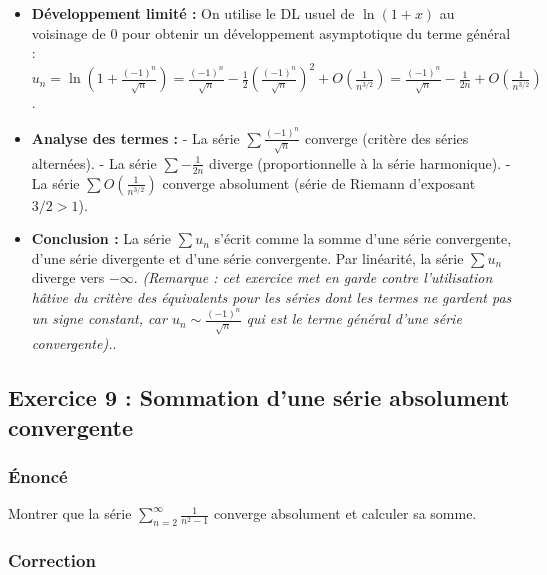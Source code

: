 \documentclass[12pt,a4paper]{report}
\begin{document}
\begin{itemize}
\item \textbf{Développement limité :}
   On utilise le DL usuel de $\ln(1+x)$ au voisinage de 0 pour obtenir un développement asymptotique du terme général :
   $u_n = \ln(1 + \frac{(-1)^n}{\sqrt{n}}) = \frac{(-1)^n}{\sqrt{n}} - \frac{1}{2}(\frac{(-1)^n}{\sqrt{n}})^2 + O(\frac{1}{n^{3/2}}) = \frac{(-1)^n}{\sqrt{n}} - \frac{1}{2n} + O(\frac{1}{n^{3/2}})$.
\item \textbf{Analyse des termes :}
   - La série $\sum \frac{(-1)^n}{\sqrt{n}}$ converge (critère des séries alternées).
   - La série $\sum -\frac{1}{2n}$ diverge (proportionnelle à la série harmonique).
   - La série $\sum O(\frac{1}{n^{3/2}})$ converge absolument (série de Riemann d'exposant $3/2 > 1$).
\item \textbf{Conclusion :}
   La série $\sum u_n$ s'écrit comme la somme d'une série convergente, d'une série divergente et d'une série convergente.
   Par linéarité, la série $\sum u_n$ diverge vers $-\infty$.
   \textit{(Remarque : cet exercice met en garde contre l'utilisation hâtive du critère des équivalents pour les séries dont les termes ne gardent pas un signe constant, car $u_n \sim \frac{(-1)^n}{\sqrt{n}}$ qui est le terme général d'une série convergente).}.
\end{itemize}


\subsection{Exercice 9 : Sommation d'une série absolument convergente}

\subsubsection{Énoncé}
Montrer que la série $\sum_{n=2}^\infty \frac{1}{n^2 - 1}$ converge absolument et calculer sa somme.

\subsubsection{Correction}
\end{document}
